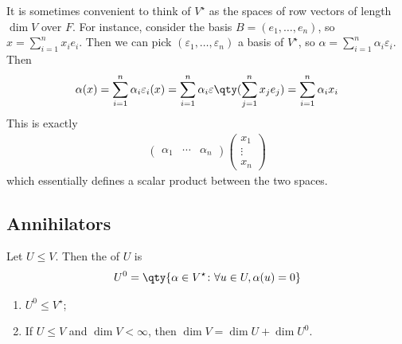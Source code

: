 \begin{remark}
	It is sometimes convenient to think of $V^\star$ as the spaces of row vectors of length $\dim V$ over $F$.
	For instance, consider the basis $B = (e_1, \dots, e_n)$, so $x = \sum_{i=1}^n x_i e_i$.
	Then we can pick $(\varepsilon_1, \dots, \varepsilon_n)$ a basis of $V^\star$, so $\alpha = \sum_{i=1}^n \alpha_i \varepsilon_i$.
	Then
	\begin{align*}
		\alpha(x) = \sum_{i=1}^n \alpha_i \varepsilon_i(x) = \sum_{i=1}^n \alpha_i \varepsilon\qty(\sum_{j=1}^n x_j e_j) = \sum_{i=1}^n \alpha_i x_i
	\end{align*}
	This is exactly
	\begin{align*}
		\begin{pmatrix} \alpha_1 & \cdots & \alpha_n \end{pmatrix} \begin{pmatrix} x_1 \\ \vdots \\ x_n \end{pmatrix}
	\end{align*}
	which essentially defines a scalar product between the two spaces.
\end{remark}

\subsection{Annihilators}
\begin{definition}[Annihilator]
	Let $U \leq V$.
	Then the  of $U$ is
	\begin{align*}
		U^0 = \qty{\alpha \in V^\star \colon \forall u \in U, \alpha(u) = 0}
	\end{align*}
\end{definition}

\begin{lemma} \label{lem:annihilator}
	\begin{enumerate}
		\item $U^0 \leq V^\star$;
		\item If $U \leq V$ and $\dim V < \infty$, then $\dim V = \dim U + \dim U^0$.
	\end{enumerate}
\end{lemma}


